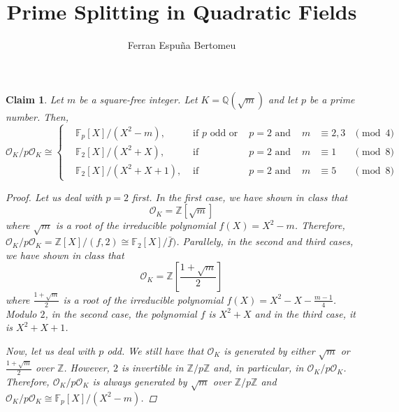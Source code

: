 \documentclass[11pt]{article}
\title{Prime Splitting in Quadratic Fields}
\author{Ferran Espuña Bertomeu}
\newtheorem{claim}[theorem]{Claim}
\theoremstyle{definition}
\begin{document}
    \maketitle

    \begin{claim}\label{claim:fancy_isomorphishm}
        Let $m$ be a square-free integer.
        Let $K=\mathbb{Q}\left(\sqrt {m}\right)$ and let $p$ be a prime number.
        Then,
       \[
            \mathcal{O}_K / p \mathcal{O}_K \cong
            \left\{\begin{align*}
                &\mathbb{F}_p[X]/(X^2-m),  &\text{ if }  p \text{ odd or } &p = 2 \text{ and } &m  &\equiv 2, 3 &\pmod 4 \\
                &\mathbb{F}_2[X]/(X^2+X), &\text{ if } &p = 2 \text{ and } &m  &\equiv 1 &\pmod 8 \\
                &\mathbb{F}_2[X]/(X^2+X+1), &\text{ if } &p = 2 \text{ and } &m  &\equiv 5 &\pmod 8
                \end{align*}

        \]
        \begin{proof}

            Let us deal with $p=2$ first.
            In the first case, we have shown in class that
            \[
                \mathcal{O}_K = \mathbb{Z}\left[\sqrt{m}\right]
            \]
            where $\sqrt {m}$ is a root of the irreducible polynomial $f(X) = X^2-m$.
            Therefore, $\mathcal{O}_K / p \mathcal{O}_K = \mathbb{Z}[X]/(f, 2) \cong \mathbb{F}_2[X]/\bar{f})$.
            Parallely, in the second and third cases, we have shown in class that
            \[
                \mathcal{O}_K = \mathbb{Z}\left[\frac{1+\sqrt{m}}{2}\right]
            \]
            where $\frac{1+\sqrt{m}}{2}$ is a root of the irreducible polynomial $f(X) = X^2-X-\frac{m-1}{4}$.
            Modulo $2$, in the second case, the polynomial $f$ is $X^2+X$ and in the third case, it is $X^2+X+1$.

            \textcolor{white}{}

            \noindent Now, let us deal with $p$ odd.
            We still have that $\mathcal{O}_K$ is generated by either
            $\sqrt{m}$ or $\frac{1+\sqrt{m}}{2}$ over $\mathbb{Z}$.
            However, $2$ is invertible in $\mathbb{Z}/p\mathbb{Z}$
            and, in particular, in $\mathcal{O}_K / p \mathcal{O}_K$.
            Therefore, $\mathcal{O}_K / p \mathcal{O}_K$ is always generated
            by $\sqrt {m}$ over $\mathbb{Z}/p\mathbb{Z}$ and  $\mathcal{O}_K / p \mathcal{O}_K \cong \mathbb{F}_p[X]/(X^2-m)$.

        \end{proof}
    \end{claim}
\end{document}
